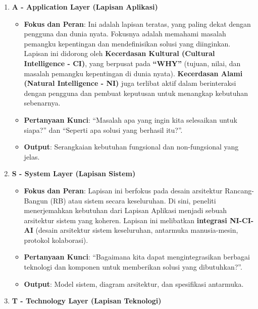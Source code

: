 \documentclass[
  letterpaper,
  DIV=11,
  numbers=noendperiod]{scrreprt}
\providecommand{\tightlist}{%
  \setlength{\itemsep}{0pt}\setlength{\parskip}{0pt}}
\begin{document}
\begin{enumerate}
\def\labelenumi{\arabic{enumi}.}
\tightlist
\item
  \textbf{A - Application Layer (Lapisan Aplikasi)}

  \begin{itemize}
  \tightlist
  \item
    \textbf{Fokus dan Peran}: Ini adalah lapisan teratas, yang paling
    dekat dengan pengguna dan dunia nyata. Fokusnya adalah memahami
    masalah pemangku kepentingan dan mendefinisikan solusi yang
    diinginkan. Lapisan ini didorong oleh \textbf{Kecerdasan Kultural
    (Cultural Intelligence - CI)}, yang berpusat pada \textbf{``WHY''}
    (tujuan, nilai, dan masalah pemangku kepentingan di dunia nyata).
    \textbf{Kecerdasan Alami (Natural Intelligence - NI)} juga terlibat
    aktif dalam berinteraksi dengan pengguna dan pembuat keputusan untuk
    menangkap kebutuhan sebenarnya.
  \item
    \textbf{Pertanyaan Kunci}: ``Masalah apa yang ingin kita selesaikan
    untuk siapa?'' dan ``Seperti apa solusi yang berhasil itu?''.
  \item
    \textbf{Output}: Serangkaian kebutuhan fungsional dan non-fungsional
    yang jelas.
  \end{itemize}
\item
  \textbf{S - System Layer (Lapisan Sistem)}

  \begin{itemize}
  \tightlist
  \item
    \textbf{Fokus dan Peran}: Lapisan ini berfokus pada desain
    arsitektur Rancang-Bangun (RB) atau sistem secara keseluruhan. Di
    sini, peneliti menerjemahkan kebutuhan dari Lapisan Aplikasi menjadi
    sebuah arsitektur sistem yang koheren. Lapisan ini melibatkan
    \textbf{integrasi NI-CI-AI} (desain arsitektur sistem keseluruhan,
    antarmuka manusia-mesin, protokol kolaborasi).
  \item
    \textbf{Pertanyaan Kunci}: ``Bagaimana kita dapat mengintegrasikan
    berbagai teknologi dan komponen untuk memberikan solusi yang
    dibutuhkan?''.
  \item
    \textbf{Output}: Model sistem, diagram arsitektur, dan spesifikasi
    antarmuka.
  \end{itemize}
\item
  \textbf{T - Technology Layer (Lapisan Teknologi)}


\end{enumerate}
\end{document}

